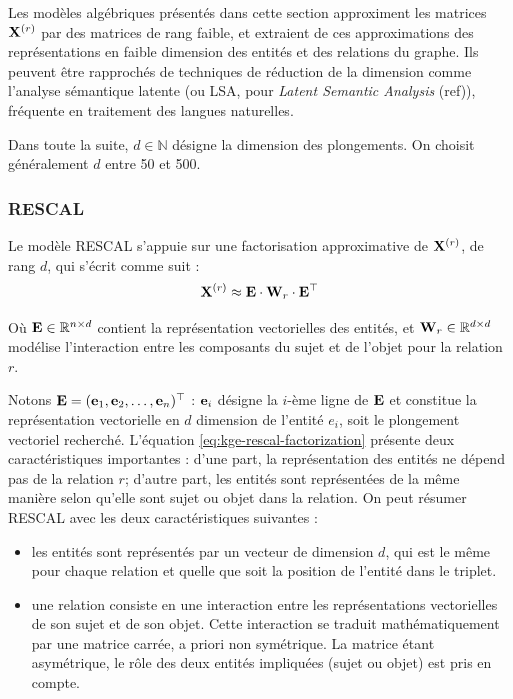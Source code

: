 Les modèles algébriques présentés dans cette section approximent les matrices $\bf{X}^{(r)}$ par des matrices de rang faible, et extraient de ces approximations des représentations en faible dimension des entités et des relations du graphe. Ils peuvent être rapprochés de techniques de réduction de la dimension comme l'analyse sémantique latente (ou LSA, pour \textit{Latent Semantic Analysis} (ref)), fréquente en traitement des langues naturelles.

Dans toute la suite, $d \in \mathbb{N}$ désigne la dimension des plongements. On choisit généralement $d$ entre 50 et 500.

\subsubsection{RESCAL}

Le modèle RESCAL \cite{nickel2011learning} s'appuie sur une factorisation approximative de $\bf{X}^{(r)}$, de rang $d$, qui s'écrit comme suit  :
\begin{equation}
    \bf{X}^{(r)} \approx \bf{E} \cdot \bf{W}_r \cdot \bf{E}^\top
    \label{eq:kge-rescal-factorization}
\end{equation}

Où $\bf{E} \in \R^{n \times d}$ contient la représentation vectorielles des entités, et $\bf{W}_r \in \R^{d \times d}$ modélise l'interaction entre les composants du sujet et de l'objet pour la relation $r$.

Notons $\bf{E} = (\bf{e}_1, \bf{e}_2, \ldots, \bf{e}_n)^\top$ : $\bf{e}_i$ désigne la $i$-ème ligne de $\bf{E}$ et constitue la représentation vectorielle en $d$ dimension de l'entité $e_i$, soit le plongement vectoriel recherché. L'équation \ref{eq:kge-rescal-factorization} présente deux caractéristiques importantes : d'une part, la représentation des entités ne dépend pas de la relation $r$; d'autre part, les entités sont représentées de la même manière selon qu'elle sont sujet ou objet dans la relation. On peut résumer RESCAL avec les deux caractéristiques suivantes :
\begin{itemize}
    \item les entités sont représentés par un vecteur de dimension $d$, qui est le même pour chaque relation et quelle que soit la position de l'entité dans le triplet. 
    \item une relation consiste en une interaction entre les représentations vectorielles de son sujet et de son objet. Cette interaction se traduit mathématiquement par une matrice carrée, a priori non symétrique. La matrice étant asymétrique, le rôle des deux entités impliquées (sujet ou objet) est pris en compte.
\end{itemize}


